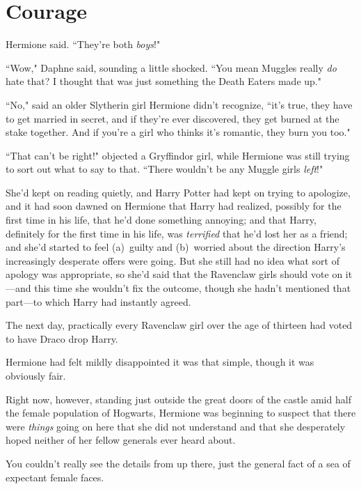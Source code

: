 \chapter{Courage}

 Hermione said. ``They're both \emph{boys}!"

\hplettrineextrapara
``Wow," Daphne said, sounding a little shocked. ``You mean Muggles really \emph{do} hate that? I thought that was just something the Death Eaters made up."

``No," said an older Slytherin girl Hermione didn't recognize, ``it's true, they have to get married in secret, and if they're ever discovered, they get burned at the stake together. And if you're a girl who thinks it's romantic, they burn you too."

``That can't be right!" objected a Gryffindor girl, while Hermione was still trying to sort out what to say to that. ``There wouldn't be any Muggle girls \emph{left}!"

She'd kept on reading quietly, and Harry Potter had kept on trying to apologize, and it had soon dawned on Hermione that Harry had realized, possibly for the first time in his life, that he'd done something annoying; and that Harry, definitely for the first time in his life, was \emph{terrified} that he'd lost her as a friend; and she'd started to feel (a)~guilty and (b)~worried about the direction Harry's increasingly desperate offers were going. But she still had no idea what sort of apology was appropriate, so she'd said that the Ravenclaw girls should vote on it—and this time she wouldn't fix the outcome, though she hadn't mentioned that part—to which Harry had instantly agreed.

The next day, practically every Ravenclaw girl over the age of thirteen had voted to have Draco drop Harry.

Hermione had felt mildly disappointed it was that simple, though it was obviously fair.

Right now, however, standing just outside the great doors of the castle amid half the female population of Hogwarts, Hermione was beginning to suspect that there were \emph{things} going on here that she did not understand and that she desperately hoped neither of her fellow generals ever heard about.

\later

You couldn't really see the details from up there, just the general fact of a sea of expectant female faces.

